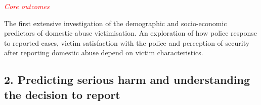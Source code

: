 \documentclass[11pt, a4paper]{article}
\begin{document}








\textcolor{red}{\textit{Core outcomes}} 

The first extensive investigation of the demographic and socio-economic predictors of domestic abuse victimisation. An exploration of how police response to reported cases, victim satisfaction with the police and perception of security after reporting domestic abuse depend on victim characteristics.

\newpage


\subsection*{2. Predicting serious harm and understanding the decision to report}
\end{document}

